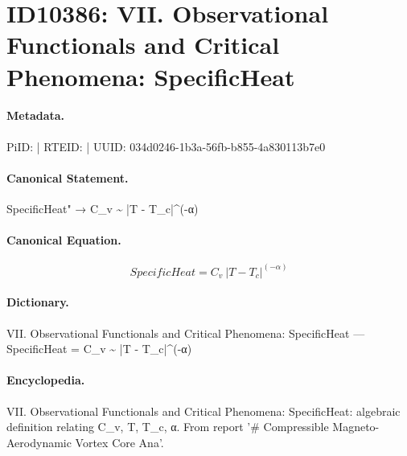 \section*{ID10386: VII. Observational Functionals and Critical Phenomena: SpecificHeat}
\paragraph{Metadata.}
PiID:  | RTEID:  | UUID: 034d0246-1b3a-56fb-b855-4a830113b7e0

\paragraph{Canonical Statement.}
SpecificHeat" → C\_v \textasciitilde{} |T - T\_c|\textasciicircum{}(-α)

\paragraph{Canonical Equation.}
\[
SpecificHeat = C_v ~ |T - T_c|^(-α)
\]

\paragraph{Dictionary.}
VII. Observational Functionals and Critical Phenomena: SpecificHeat — SpecificHeat = C\_v \textasciitilde{} |T - T\_c|\textasciicircum{}(-α)

\paragraph{Encyclopedia.}
VII. Observational Functionals and Critical Phenomena: SpecificHeat: algebraic definition relating C\_v, T, T\_c, α. From report '\# Compressible Magneto-Aerodynamic Vortex Core Ana'.
